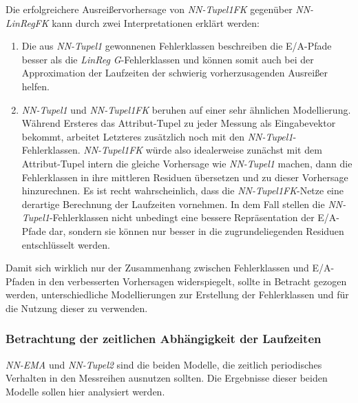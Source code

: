 \documentclass[
	12pt,
	a4paper,
	BCOR10mm,
	DIV14,
	listof=totoc,
	bibliography=totoc,
	headsepline
]{scrreprt}
\begin{document}
Die erfolgreichere Ausreißervorhersage von \textit{NN-Tupel1FK} gegenüber \textit{NN-LinRegFK} kann durch zwei Interpretationen erklärt werden:
\begin{enumerate}
	\item Die aus \textit{NN-Tupel1} gewonnenen Fehlerklassen beschreiben die E/A-Pfade besser als die \textit{LinReg G}-Fehlerklassen und können somit auch bei der Approximation der Laufzeiten der schwierig vorherzusagenden Ausreißer helfen.
	\item \textit{NN-Tupel1} und \textit{NN-Tupel1FK} beruhen auf einer sehr ähnlichen Modellierung.
	Während Ersteres das Attribut-Tupel zu jeder Messung als Eingabevektor bekommt, arbeitet Letzteres zusätzlich noch mit den \textit{NN-Tupel1}-Fehlerklassen.
	\textit{NN-Tupel1FK} würde also idealerweise zunächst mit dem Attribut-Tupel intern die gleiche Vorhersage wie \textit{NN-Tupel1} machen, dann die Fehlerklassen in ihre mittleren Residuen übersetzen und zu dieser Vorhersage hinzurechnen.
	Es ist recht wahrscheinlich, dass die \textit{NN-Tupel1FK}-Netze eine derartige Berechnung der Laufzeiten vornehmen.
	In dem Fall stellen die \textit{NN-Tupel1}-Fehlerklassen nicht unbedingt eine bessere Repräsentation der E/A-Pfade dar, sondern sie können nur besser in die zugrundeliegenden Residuen entschlüsselt werden.
\end{enumerate}
Damit sich wirklich nur der Zusammenhang zwischen Fehlerklassen und E/A-Pfaden in den verbesserten Vorhersagen widerspiegelt, sollte in Betracht gezogen werden, unterschiedliche Modellierungen zur Erstellung der Fehlerklassen und für die Nutzung dieser zu verwenden.

\subsubsection{Betrachtung der zeitlichen Abhängigkeit der Laufzeiten}
\textit{NN-EMA} und \textit{NN-Tupel2} sind die beiden Modelle, die zeitlich periodisches Verhalten in den Messreihen ausnutzen sollten.
Die Ergebnisse dieser beiden Modelle sollen hier analysiert werden.\medskip
\end{document}
